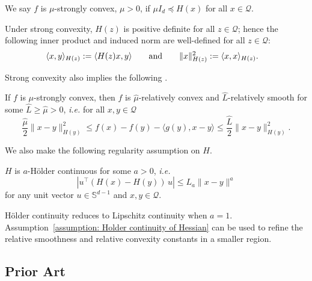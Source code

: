 \begin{definition}
    \label{Definition: strong convexity}
    We say $f$ is $\mu$-strongly convex, $\mu>0$, if $\mu I_d \preceq H(x)$ for all $x \in \mathcal{Q}$.
\end{definition}



Under strong convexity, $H(z)$ is positive definite for all $ z\in \mathcal{Q}$; hence the following inner product and induced norm are well-defined for all $z \in \mathcal{Q}$:
\begin{align*}
    \langle x, y \rangle _{H(z)} & := \langle H(z)x, y \rangle  \qquad\textnormal{and}\qquad
    \|x\|_{H(z)}^2 := \langle x, x\rangle_{H(z)}.
\end{align*}

Strong convexity also implies the following \cite[Proposition~2]{gower2019rsn}.
\begin{lemma}
    \label{lemma: Smoothness and convexity}
    If $f$ is $\mu$-strongly convex, then $f$ is $\hat{\mu}$-relatively convex and $\hat{L}$-relatively smooth for some $\hat{L} \geq \hat{\mu}>0$, \textit{i.e.} for all $x, y \in \mathcal{Q} $
    \begin{equation*}
        \frac{\hat{\mu}}{2}\|x-y\|_{H(y)}^2 \leq  f(x) - f(y) - \langle g(y), x-y \rangle \leq \frac{\hat{L}}{2}\|x-y\|_{H(y)}^2.
    \end{equation*}
\end{lemma}

We also make the following regularity assumption on $H$.
\begin{assumption}\label{assumption: Holder continuity of Hessian}
    $H$ is $a$-H\"{o}lder continuous for some $a>0$, \textit{i.e.}
    \begin{equation}\label{assumption: eq: Holder continuity of H}
        |{u}^{\top} (H(x) - H(y))\, {u}| \leq L_a \|x-y\|^{a}
    \end{equation}
    for any unit vector ${u}\in \mathbb{S}^{d-1}$ and $x, y \in \mathcal{Q}$.
\end{assumption}
H\"{o}lder continuity reduces to Lipschitz continuity when $a=1$. Assumption~\ref{assumption: Holder continuity of Hessian} can be used to refine the relative smoothness and relative convexity constants in a smaller region.

\subsection{Prior Art}
\label{sec:PriorArt}

